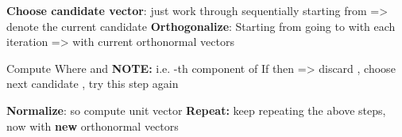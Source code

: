 \begin{itemize}

      \vItem
            \textbf{Choose candidate vector}: just work through
             sequentially starting
            from  =\textgreater{} denote the current
            candidate 
      \vItem
            \textbf{Orthogonalize}: Starting from  going to
             with each iteration =\textgreater{} with current
            orthonormal vectors 

            \begin{itemize}
                  \vItem
                        Compute
                  \vItem Where  and
                  \vItem
                        \textbf{NOTE:}
                        i.e. -th component of 
                  \vItem
                        If  then
                        =\textgreater{} discard , choose next
                        candidate , try this step again
            \end{itemize}
      \vItem
            \textbf{Normalize}:  so
            compute unit vector
      \vItem
            \textbf{Repeat:} keep repeating the above steps, now with
            \textbf{new} orthonormal vectors
\end{itemize}


